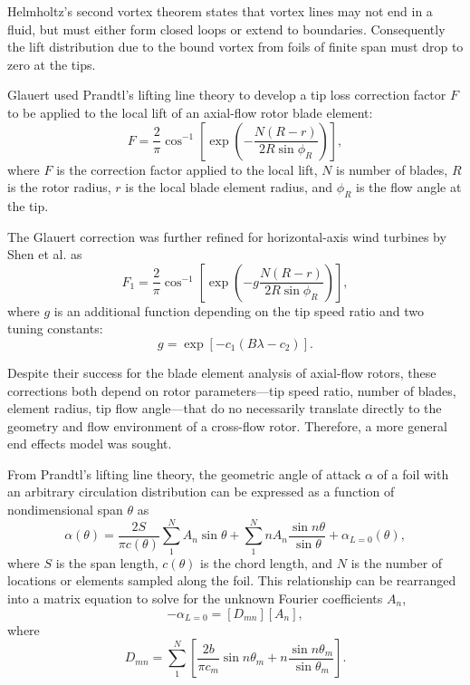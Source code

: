 Helmholtz's second vortex theorem states that vortex lines may not end in a
fluid, but must either form closed loops or extend to boundaries. Consequently
the lift distribution due to the bound vortex from foils of finite span must
drop to zero at the tips.

Glauert\cite{Glauert1935} used Prandtl's lifting line theory \cite{Prandtl1927}
to develop a tip loss correction factor $F$ to be applied to the local lift of
an axial-flow rotor blade element:
\begin{equation}
    F = \frac{2}{\pi} \cos^{-1} \left[ \exp \left( - \frac{N (R-r)}{2R \sin
        \phi_R} \right) \right],
\end{equation}
where $F$ is the correction factor applied to the local lift, $N$ is number of
blades, $R$ is the rotor radius, $r$ is the local blade element radius, and
$\phi_R$ is the flow angle at the tip.

The Glauert correction was further refined for horizontal-axis wind turbines by
Shen et al. \cite{Shen2005a} as
\begin{equation}
    F_1 = \frac{2}{\pi} \cos^{-1} \left[ \exp \left( -g \frac{N (R-r)}{2R \sin
    \phi_R} \right) \right],
\end{equation}
where $g$ is an additional function depending on the tip speed ratio and two
tuning constants:
\begin{equation}
    g = \exp [ -c_1 (B \lambda - c_2) ].
\end{equation}

Despite their success for the blade element analysis of axial-flow rotors, these
corrections both depend on rotor parameters---tip speed ratio, number of blades,
element radius, tip flow angle---that do no necessarily translate directly to
the geometry and flow environment of a cross-flow rotor. Therefore, a more
general end effects model was sought.

From Prandtl's lifting line theory, the geometric angle of attack $\alpha$ of a
foil with an arbitrary circulation distribution can be expressed as a function
of nondimensional span $\theta$ as \cite{Anderson2001}
\begin{equation}
    \alpha (\theta) = \frac{2S}{\pi c (\theta)}
    \sum_1^N A_n \sin \theta
    + \sum_1^N n A_n \frac{\sin n \theta}{\sin \theta}
    + \alpha_{L = 0}(\theta),
    \label{eq:lifting-line}
\end{equation}
where $S$ is the span length, $c(\theta)$ is the chord length, and $N$ is the
number of locations or elements sampled along the foil. This relationship can be
rearranged into a matrix equation to solve for the unknown Fourier coefficients
$A_n$,
\begin{equation}
    [\alpha_m ] - \alpha_{L=0} = [D_{mn}][A_n],
\end{equation}
where
\begin{equation}
    D_{mn} = \sum_1^N \left[ \frac{2b}{\pi c_m} \sin n \theta_m + n \frac{\sin n
        \theta_m}{\sin \theta_m} \right].
\end{equation}

